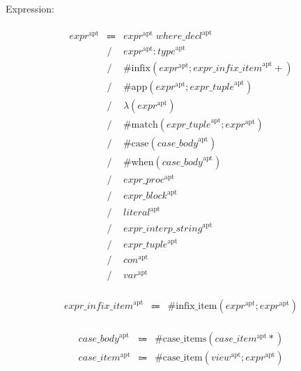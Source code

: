 Expression:

\begin{align*}
    \begin{array}{rcll}
        \mathit{expr}^\mathrm{apt}
        &\Coloneq &\mathit{expr}^\mathrm{apt}\; \mathit{where\_decl}^\mathrm{apt} \\
        &\mathrel{/} &\mathit{expr}^\mathrm{apt}: \mathit{type}^\mathrm{apt} \\
        &\mathrel{/} &\mathrm{\#infix}(\mathit{expr}^\mathrm{apt}; \mathit{expr\_infix\_item}^\mathrm{apt}{+}) \\
        &\mathrel{/} &\mathrm{\#app}(\mathit{expr}^\mathrm{apt}; \mathit{expr\_tuple}^\mathrm{apt}) \\
        &\mathrel{/} &\lambda(\mathit{expr}^\mathrm{apt}) \\
        &\mathrel{/} &\mathrm{\#match}(\mathit{expr\_tuple}^\mathrm{apt}; \mathit{expr}^\mathrm{apt}) \\
        &\mathrel{/} &\mathrm{\#case}(\mathit{case\_body}^\mathrm{apt}) \\
        &\mathrel{/} &\mathrm{\#when}(\mathit{case\_body}^\mathrm{apt}) \\
        &\mathrel{/} &\mathit{expr\_proc}^\mathrm{apt} \\
        &\mathrel{/} &\mathit{expr\_block}^\mathrm{apt} \\
        &\mathrel{/} &\mathit{literal}^\mathrm{apt} \\
        &\mathrel{/} &\mathit{expr\_interp\_string}^\mathrm{apt} \\
        &\mathrel{/} &\mathit{expr\_tuple}^\mathrm{apt} \\
        &\mathrel{/} &\mathit{con}^\mathrm{apt} \\
        &\mathrel{/} &\mathit{var}^\mathrm{apt}
    \end{array}
\end{align*}

\begin{align*}
    \begin{array}{rcll}
        \mathit{expr\_infix\_item}^\mathrm{apt}
        &\Coloneq &\mathrm{\#infix\_item}(\mathit{expr}^\mathrm{apt}; \mathit{expr}^\mathrm{apt})
    \end{array}
\end{align*}

\begin{align*}
    \begin{array}{rcll}
        \mathit{case\_body}^\mathrm{apt}
        &\Coloneq &\mathrm{\#case\_items}(\mathit{case\_item}^\mathrm{apt}{*}) \\
        \mathit{case\_item}^\mathrm{apt}
        &\Coloneq &\mathrm{\#case\_item}(\mathit{view}^\mathrm{apt}; \mathit{expr}^\mathrm{apt})
    \end{array}
\end{align*}

